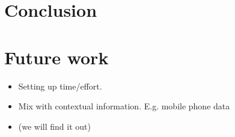 \documentclass{article}
\begin{document}
\section{Conclusion}


\section{Future work}

\begin{itemize}
\item Setting up time/effort. 
\item Mix with contextual information. E.g. mobile phone data 
\item (we will find it out)
\end{itemize}





\end{document}

